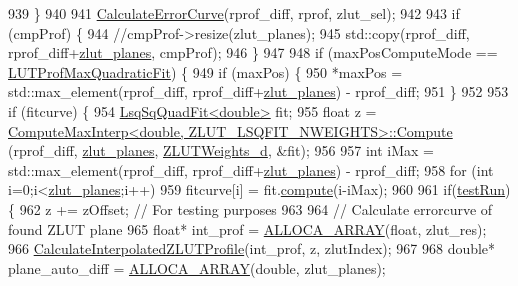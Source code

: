 \begin{DoxyCode}
{{{{{{939     \}
940 
941     \hyperlink{class_c_p_u_tracker_a3505604c838186c348562bac8a2fedfe}{CalculateErrorCurve}(rprof\_diff, rprof, zlut\_sel);
942 
943     \textcolor{keywordflow}{if} (cmpProf) \{
944         \textcolor{comment}{//cmpProf->resize(zlut\_planes);}
945         std::copy(rprof\_diff, rprof\_diff+\hyperlink{class_c_p_u_tracker_ad28d60ad587ae3f89b9dba7f82c135f7}{zlut\_planes}, cmpProf);
946     \}
947 
948     \textcolor{keywordflow}{if} (maxPosComputeMode == \hyperlink{class_c_p_u_tracker_a196ac690351a7a8449fe21012de9efdfa699b606aff628359036eef4585adba0e}{LUTProfMaxQuadraticFit}) \{
949         \textcolor{keywordflow}{if} (maxPos) \{
950             *maxPos = std::max\_element(rprof\_diff, rprof\_diff+\hyperlink{class_c_p_u_tracker_ad28d60ad587ae3f89b9dba7f82c135f7}{zlut\_planes}) - rprof\_diff;
951         \}
952 
953         \textcolor{keywordflow}{if} (fitcurve) \{
954             \hyperlink{class_lsq_sq_quad_fit}{LsqSqQuadFit<double>} fit;
955             \textcolor{keywordtype}{float} z = \hyperlink{class_compute_max_interp_aa1ec2481d8a866f624f05ba53fb2d3bc}{ComputeMaxInterp<double, ZLUT\_LSQFIT\_NWEIGHTS>::Compute}
      (rprof\_diff, \hyperlink{class_c_p_u_tracker_ad28d60ad587ae3f89b9dba7f82c135f7}{zlut\_planes}, \hyperlink{cpu__tracker_8cpp_a79c9b3cd0d6bf4409d49ad9b784f7f87}{ZLUTWeights\_d}, &fit);
956 
957             \textcolor{keywordtype}{int} iMax = std::max\_element(rprof\_diff, rprof\_diff+\hyperlink{class_c_p_u_tracker_ad28d60ad587ae3f89b9dba7f82c135f7}{zlut\_planes}) - rprof\_diff;
958             \textcolor{keywordflow}{for} (\textcolor{keywordtype}{int} i=0;i<\hyperlink{class_c_p_u_tracker_ad28d60ad587ae3f89b9dba7f82c135f7}{zlut\_planes};i++)
959                 fitcurve[i] = fit.\hyperlink{class_lsq_sq_quad_fit_a6aa52c07c1b7a5057f2a2cd878035d7d}{compute}(i-iMax);
960             
961             \textcolor{keywordflow}{if}(\hyperlink{class_c_p_u_tracker_a5dd04ccf64ee6885b2dc272553c29644}{testRun})  \{
962                 z += zOffset; \textcolor{comment}{// For testing purposes}
963 
964                 \textcolor{comment}{// Calculate errorcurve of found ZLUT plane}
965                 \textcolor{keywordtype}{float}* int\_prof = \hyperlink{std__incl_8h_a37dbccb865134ee3a70c5044b365ded7}{ALLOCA\_ARRAY}(\textcolor{keywordtype}{float}, zlut\_res);
966                 \hyperlink{class_c_p_u_tracker_a4ae169f9618eeb09f129815229eaeb33}{CalculateInterpolatedZLUTProfile}(int\_prof, z, zlutIndex);
967 
968                 \textcolor{keywordtype}{double}* plane\_auto\_diff = \hyperlink{std__incl_8h_a37dbccb865134ee3a70c5044b365ded7}{ALLOCA\_ARRAY}(\textcolor{keywordtype}{double}, zlut\_planes);
}}}}}}
\end{DoxyCode}
